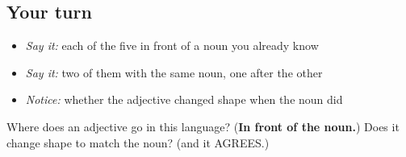 \subsection*{Your turn}
\begin{itemize}
\raggedright
  \item \emph{Say it:} each of the five in front of a noun you already know
  \item \emph{Say it:} two of them with the same noun, one after the other
  \item \emph{Notice:} whether the adjective changed shape when the noun did
\end{itemize}

\begin{tcolorbox}[breakable,colback=teal!4,colframe=teal!35!black,title={Before you move on}]
Where does an adjective go in this language? (\textbf{In front of the noun.}) Does it change shape to match the noun? (and it AGREES.)
\end{tcolorbox}
